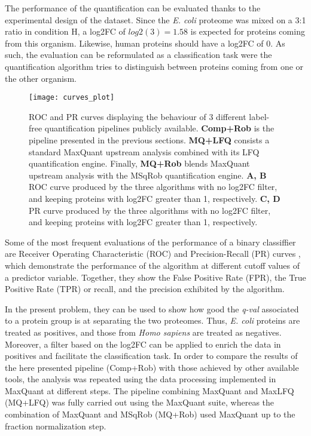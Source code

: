 The performance of the quantification can be evaluated thanks to the experimental design of the dataset. Since the \textit{E. coli} proteome was mixed on a 3:1 ratio in condition H, a \ac{log2FC} of $log2(3)=1.58$ is expected for proteins coming from this organism. Likewise, human proteins should have a \ac{log2FC} of 0. As such, the evaluation can be reformulated as a classification task were the quantification algorithm tries to distinguish between proteins coming from one or the other organism.


\begin{figure}[H]
\centering
\texttt{[image: curves\_plot]}
\caption[Classifier evaluation: ROC and PR curves]{ROC and PR curves displaying the behaviour of 3 different label-free quantification pipelines publicly available. \textbf{Comp+Rob} is the pipeline presented in the previous sections. \textbf{MQ+LFQ} consists a standard MaxQuant upstream analysis combined with its LFQ quantification engine. Finally, \textbf{MQ+Rob} blends MaxQuant upstream analysis with the MSqRob quantification engine. \textbf{A, B} ROC curve produced by the three algorithms with no \ac{log2FC} filter, and keeping proteins with \ac{log2FC} greater than 1, respectively. \textbf{C, D} PR curve produced by the three algorithms with no \ac{log2FC} filter, and keeping proteins with \ac{log2FC} greater than 1, respectively.}
\label{fig:roc_curves}
\end{figure}


Some of the most frequent evaluations of the performance of a binary classiffier are Receiver Operating Characteristic (ROC) and Precision-Recall (PR) curves \cite{Bradley1997}, which demonstrate the performance of the algorithm at different cutoff values of a predictor variable. Together, they show the False Positive Rate (FPR), the True Positive Rate (TPR) or recall, and the precision exhibited by the algorithm.




In the present problem, they can be used to show how good the \textit{q-val} associated to a protein group is at separating the two proteomes. Thus, \textit{E. coli} proteins are treated as positives, and those from \textit{Homo sapiens} are treated as negatives. Moreover, a filter based on the \ac{log2FC} can be applied to enrich the data in positives and facilitate the classification task.
In order to compare the results of the here presented pipeline (Comp+Rob) with those achieved by other available tools, the analysis was repeated using the data processing implemented in MaxQuant \cite{Cox2008} at different steps. The pipeline combining MaxQuant and MaxLFQ (MQ+LFQ) was fully carried out using the MaxQuant suite, whereas the combination of MaxQuant and MSqRob (MQ+Rob) used MaxQuant up to the fraction normalization step.

